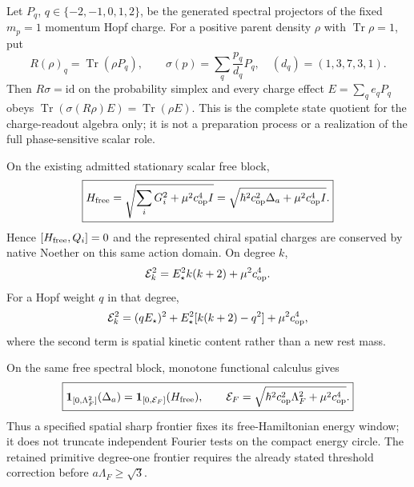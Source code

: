 \documentclass[12pt,a4paper]{article}
\begin{document}
\begin{proposition}
\label{p4:prop:exact-hopf-charge-state-quotient}
Let $P_q$, $q\in\{-2,-1,0,1,2\}$, be the generated spectral projectors of
the fixed $m_p=1$ momentum Hopf charge.  For a positive parent density
$\rho$ with $\operatorname{Tr}\rho=1$, put
\[
 R(\rho)_q=\operatorname{Tr}(\rho P_q),\qquad
 \sigma(p)=\sum_q\frac{p_q}{d_q}P_q,
 \quad(d_q)=(1,3,7,3,1).
\]
Then $R\sigma=\mathrm{id}$ on the probability simplex and every charge effect
$E=\sum_qe_qP_q$ obeys
$\operatorname{Tr}(\sigma(R\rho)E)=\operatorname{Tr}(\rho E)$.
This is the complete state quotient for the charge-readout algebra only; it is
not a preparation process or a realization of the full phase-sensitive scalar
role.
\end{proposition}

\begin{corollary}
\label{p4:cor:clock-family-free-hamiltonian}
On the existing admitted stationary scalar free block,
\[
 \boxed{H_{\rm free}
 =\sqrt{\sum_iG_i^2+\mu^2c_{\rm op}^4I}
 =\sqrt{\hbar^2c_{\rm op}^2\Delta_a+\mu^2c_{\rm op}^4I}.}
\]
Hence $[H_{\rm free},Q_i]=0$ and the represented chiral spatial charges are
conserved by native Noether on this same action domain.  On degree $k$,
\[
 \mathcal E_k^2=E_\star^2k(k+2)+\mu^2c_{\rm op}^4.
\]
For a Hopf weight $q$ in that degree,
\[
 \mathcal E_k^2=(qE_\star)^2
 +E_\star^2[k(k+2)-q^2]+\mu^2c_{\rm op}^4,
\]
where the second term is spatial kinetic content rather than a new rest mass.
\end{corollary}

\begin{corollary}
\label{p4:cor:matched-spatial-free-energy-window}
On the same free spectral block, monotone functional calculus gives
\[
 \boxed{
 \mathbf1_{[0,\Lambda_F^2]}(\Delta_a)
 =\mathbf1_{[0,\mathcal E_F]}(H_{\rm free}),\qquad
 \mathcal E_F=\sqrt{\hbar^2c_{\rm op}^2\Lambda_F^2+
 \mu^2c_{\rm op}^4}.}
\]
Thus a specified spatial sharp frontier fixes its free-Hamiltonian energy
window; it does not truncate independent Fourier tests on the compact energy
circle.  The retained primitive degree-one frontier requires the already
stated threshold correction before $a\Lambda_F\ge\sqrt3$.
\end{corollary}
\end{document}
